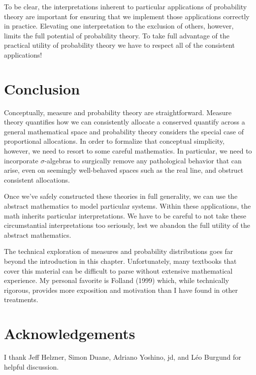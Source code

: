 \documentclass[
  letterpaper,
  DIV=11,
  numbers=noendperiod]{scrartcl}
\begin{document}
To be clear, the interpretations inherent to particular applications of
probability theory are important for ensuring that we implement those
applications correctly in practice. Elevating one interpretation to the
exclusion of others, however, limits the full potential of probability
theory. To take full advantage of the practical utility of probability
theory we have to respect all of the consistent applications!

\section{Conclusion}\label{conclusion}

Conceptually, measure and probability theory are straightforward.
Measure theory quantifies how we can consistently allocate a conserved
quantify across a general mathematical space and probability theory
considers the special case of proportional allocations. In order to
formalize that conceptual simplicity, however, we need to resort to some
careful mathematics. In particular, we need to incorporate
\(\sigma\)-algebras to surgically remove any pathological behavior that
can arise, even on seemingly well-behaved spaces such as the real line,
and obstruct consistent allocations.

Once we've safely constructed these theories in full generality, we can
use the abstract mathematics to model particular systems. Within these
applications, the math inherits particular interpretations. We have to
be careful to not take these circumstantial interpretations too
seriously, lest we abandon the full utility of the abstract mathematics.

The technical exploration of measures and probability distributions goes
far beyond the introduction in this chapter. Unfortunately, many
textbooks that cover this material can be difficult to parse without
extensive mathematical experience. My personal favorite is Folland
(1999) which, while technically rigorous, provides more exposition and
motivation than I have found in other treatments.

\section{Acknowledgements}\label{acknowledgements}

I thank Jeff Helzner, Simon Duane, Adriano Yoshino, jd, and Léo Burgund
for helpful discussion.
\end{document}
